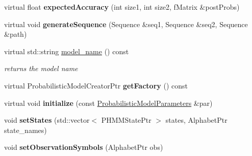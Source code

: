 \begin{DoxyCompactItemize}
\item 
\mbox{\label{classtops_1_1PairHiddenMarkovModel_ae9b621d9b963c1193862f1892dc0b808}} 
virtual float {\bfseries expected\+Accuracy} (int size1, int size2, f\+Matrix \&post\+Probs)
\item 
\mbox{\label{classtops_1_1PairHiddenMarkovModel_aab521b83d859497495f0894ddd8e43a7}} 
virtual void {\bfseries generate\+Sequence} (Sequence \&seq1, Sequence \&seq2, Sequence \&path)
\item 
\mbox{\label{classtops_1_1PairHiddenMarkovModel_a86aa7a69758b9cc9da58bbacfb13b5de}} 
virtual std\+::string \hyperlink{classtops_1_1PairHiddenMarkovModel_a86aa7a69758b9cc9da58bbacfb13b5de}{model\+\_\+name} () const
\begin{DoxyCompactList}\small\item\em returns the model name \end{DoxyCompactList}\item 
\mbox{\label{classtops_1_1PairHiddenMarkovModel_ab6841a73fb8ee44b42b2349b66d664d5}} 
virtual Probabilistic\+Model\+Creator\+Ptr {\bfseries get\+Factory} () const
\item 
\mbox{\label{classtops_1_1PairHiddenMarkovModel_a2f5a234f60248802d7e71360d00b980d}} 
virtual void {\bfseries initialize} (const \hyperlink{classtops_1_1ProbabilisticModelParameters}{Probabilistic\+Model\+Parameters} \&par)
\item 
\mbox{\label{classtops_1_1PairHiddenMarkovModel_a510e983f43da8d42b5227ae8075e81e6}} 
void {\bfseries set\+States} (std\+::vector$<$ P\+H\+M\+M\+State\+Ptr $>$ states, Alphabet\+Ptr state\+\_\+names)
\item 
\mbox{\label{classtops_1_1PairHiddenMarkovModel_af91039a69108eeddd1807a33f4a78859}} 
void {\bfseries set\+Observation\+Symbols} (Alphabet\+Ptr obs)
\item 
\mbox{\label{classtops_1_1PairHiddenMarkovModel_a85337273c7eb74483c9d76c44eee4d5d}} 

\end{DoxyCompactItemize}

